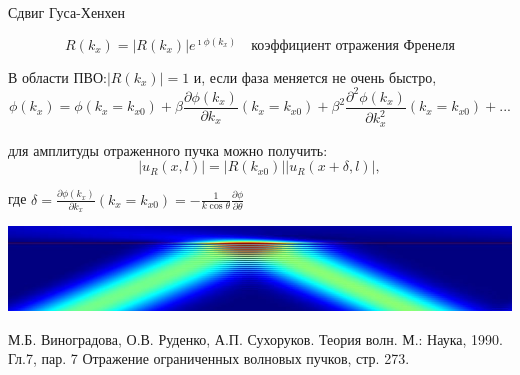 \documentclass[9pt, compress, xcolor=table]{beamer}
\begin{document}
\begin{frame}{Сдвиг Гуса-Хенхен}
\begin{center}
\begin{equation*}
R(k_x)=|R(k_x)|e^{\imath \phi(k_x)}\quad\text{коэффициент отражения Френеля}
\end{equation*}

В области ПВО:$|R(k_x)|= 1$ и, если фаза меняется не очень быстро,
\begin{equation*}
\phi(k_x) = \phi(k_x=k_{x0})+\beta\frac{\partial \phi(k_x)}{\partial k_x}(k_x=k_{x0})+\beta^2\frac{\partial^2 \phi(k_x)}{\partial k_x^2}(k_x=k_{x0})+...
\end{equation*}

для амплитуды отраженного пучка можно получить:
\begin{equation*}
|u_R(x,l)|=|R(k_{x0})||u_R(x+\delta,l)|,
\end{equation*}

где $\delta =\frac{\partial \phi(k_x)}{\partial k_x}(k_x=k_{x0})=-\frac{1}{k \cos \theta}\frac{\partial \phi}{\partial \theta}$

\includegraphics[width=\textwidth]{gh0_small}
\end{center}

{\small М.Б. Виноградова, О.В. Руденко, А.П. Сухоруков. Теория волн. М.: Наука, 1990.  Гл.7, пар. 7 Отражение ограниченных волновых пучков, стр. 273.}
\end{frame}
\end{document}
